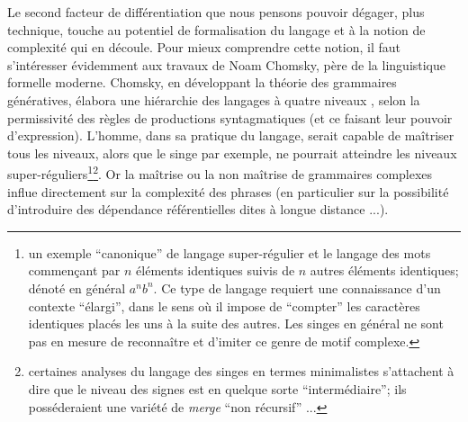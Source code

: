 \documentclass{article}
\begin{document}
		Le second facteur de différentiation que nous pensons pouvoir dégager, plus technique, touche au potentiel de formalisation du langage et à la notion de complexité qui en découle. Pour mieux comprendre cette notion, il faut s'intéresser évidemment aux travaux de Noam Chomsky, père de la linguistique formelle moderne. Chomsky, en développant la théorie des grammaires génératives, élabora une hiérarchie des langages à quatre niveaux \cite{chomsky1956}, selon la permissivité des règles de productions syntagmatiques (et ce faisant leur pouvoir d'expression). L'homme, dans sa pratique du langage, serait capable de maîtriser tous les niveaux, alors que le singe par exemple, ne pourrait atteindre les niveaux super-réguliers\footnote{un exemple ``canonique'' de langage super-régulier et le langage des mots commençant par $n$ éléments identiques suivis de $n$ autres éléments identiques; dénoté en général $a^nb^n$. Ce type de langage requiert une connaissance d'un contexte ``élargi'', dans le sens où il impose de ``compter'' les caractères identiques placés les uns à la suite des autres. Les singes en général ne sont pas en mesure de reconnaître et d'imiter ce genre de motif complexe.}\footnote{certaines analyses du langage des singes en termes minimalistes \cite{chomsky1995} s'attachent à dire que le niveau des signes est en quelque sorte ``intermédiaire''; ils posséderaient une variété de \textit{merge} ``non récursif'' \cite{dehaene2017}...}. Or la maîtrise ou la non maîtrise de grammaires complexes influe directement sur la complexité des phrases (en particulier sur la possibilité d'introduire des dépendance référentielles dites à longue distance \cite{shieber1985}...).\\
		
\end{document}
